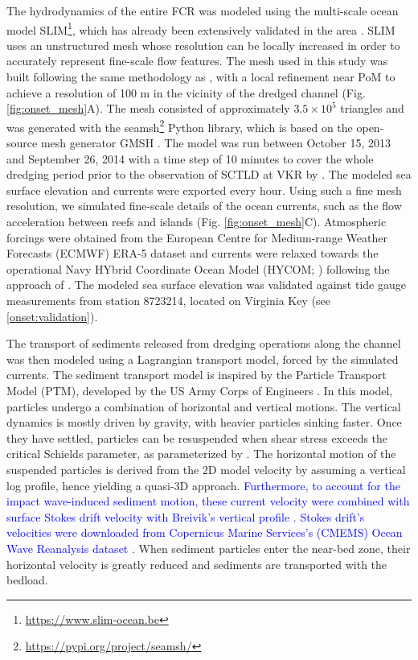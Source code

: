\documentclass[preprint,12pt,authoryear]{elsarticle}
\newcommand{\modif}[1]{\textcolor{blue}{#1}}
\begin{document}
The hydrodynamics of the entire FCR was modeled using the multi-scale ocean model SLIM\footnote{\url{ https://www.slim-ocean.be}}, which has already been extensively validated in the area \citep{frys2020fine,dobbelaere2020coupled,dobbelaere2022impacts,dobbelaere2022connecting}. SLIM uses an unstructured mesh whose resolution can be locally increased in order to accurately represent fine-scale flow features. The mesh used in this study was built following the same methodology as \cite{dobbelaere2020coupled}, with a local refinement near PoM to achieve a resolution of 100 m in the vicinity of the dredged channel (Fig. \ref{fig:onset_mesh}A). The mesh consisted of approximately $3.5\times 10^5$ triangles and was generated with the seamsh\footnote{\url{https://pypi.org/project/seamsh/}} Python library, which is based on the open-source mesh generator GMSH \citep{geuzaine2009gmsh}. The model was run between October 15, 2013 and September 26, 2014 with a time step of 10 minutes to cover the whole dredging period prior to the observation of SCTLD at VKR by \cite{precht2016unprecedented}. The modeled sea surface elevation and currents were exported every hour. Using such a fine mesh resolution, we simulated fine-scale details of the ocean currents, such as the flow acceleration between reefs and islands (Fig. \ref{fig:onset_mesh}C). Atmospheric forcings were obtained from the European Centre for Medium-range Weather Forecasts (ECMWF) ERA-5 dataset and currents were relaxed towards the operational Navy HYbrid Coordinate Ocean Model (HYCOM; \citealp{chassignet2007hycom}) following the approach of \cite{dobbelaere2022impacts}. The modeled sea surface elevation was validated against tide gauge measurements from station 8723214, located on Virginia Key (see \ref{onset:validation}).

The transport of sediments released from dredging operations along the channel was then modeled using a Lagrangian transport model, forced by the simulated currents. The sediment transport model is inspired by the Particle Transport Model (PTM), developed by the US Army Corps of Engineers \citep{macdonald2006ptm}. In this model, particles undergo a combination of horizontal and vertical motions. The vertical dynamics is mostly driven by gravity, with heavier particles sinking faster. Once they have settled, particles can be resuspended when shear stress exceeds   the critical Schields parameter, as parameterized by \cite{soulsby1997threshold}. The horizontal motion of the suspended particles is derived from the 2D model velocity by assuming a vertical log profile, hence yielding a quasi-3D approach. \modif{Furthermore, to account for the impact wave-induced sediment motion, these current velocity were combined with surface Stokes drift velocity with Breivik's vertical profile \citep{breivik2016stokes}. Stokes drift's velocities were downloaded from Copernicus Marine Services's (CMEMS) Ocean Wave Reanalysis dataset \citep{cmems}}. When sediment particles enter the near-bed zone, their horizontal velocity is greatly reduced and sediments are transported with the bedload.   
\end{document}
